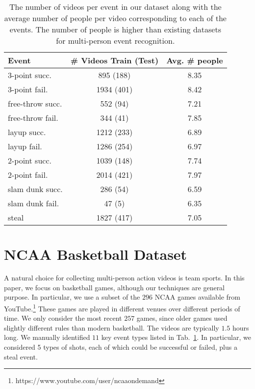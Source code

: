 \begin{table}[ht!]
\begin{center}
\small
 \begin{tabular}{|l|c|c|}
  \hline
  Event          & \# Videos Train (Test) & Avg. \# people \\ \hline \hline
  3-point succ.    & 895 (188) &  8.35 \\ 
  3-point fail.    & 1934 (401) &  8.42 \\ 
  free-throw succ. & 552 (94) &  7.21\\ 
  free-throw fail. & 344 (41) &  7.85\\  
  layup succ.      & 1212 (233) &  6.89\\ 
  layup fail.      & 1286 (254) &  6.97 \\ 
  2-point succ.    & 1039 (148) &  7.74 \\ 
  2-point fail.    & 2014 (421) &  7.97\\ 
  slam dunk succ.  & 286 (54) &  6.59 \\ 
  slam dunk fail.  & 47 (5) &  6.35\\ 
  steal & 1827 (417) & 7.05\\ \hline  
  \end{tabular}
\end{center}
  \caption{The number of videos per event in our dataset along with
  the average number of people per video corresponding to each of the
events. The number of people is higher than existing datasets for
multi-person event recognition.}
  \label{tab:data_dist}
\end{table}



\section{NCAA Basketball Dataset}
\label{sec:data}


A natural choice for collecting multi-person action videos is team sports.
In this paper, we focus on basketball games, although our techniques
are general purpose.
In particular,  we use a subset of the $296$ NCAA games available from 
YouTube.\footnote{https://www.youtube.com/user/ncaaondemand}  These games are
played in different venues over different periods of time.
We only consider the most recent $257$ games, since older games used
slightly different rules than modern basketball.
The videos are typically $1.5$ hours long.
We manually identified $11$ key event types
listed in Tab.~\ref{tab:data_dist}.
In particular, we considered 
5 types of shots, each of which could be successful or failed,
plus a steal event. 

